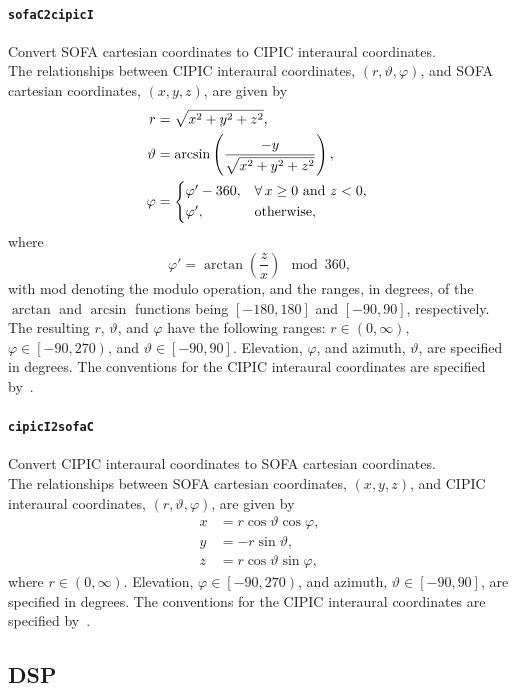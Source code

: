 \documentclass[11pt, oneside]{article}
\newcommand{\function}[1]{\paragraph*{\texttt{#1}}}
\begin{document}
\function{sofaC2cipicI} Convert SOFA cartesian coordinates to CIPIC interaural coordinates. \\
The relationships between CIPIC interaural coordinates, $\left(r,\vartheta,\varphi\right)$, and SOFA cartesian coordinates, $\left(x,y,z\right)$, are given by
\begin{align}
r &= \sqrt{x^2 + y^2 + z^2}, \\
\vartheta &= \arcsin \left(\frac{-y}{\sqrt{x^2 + y^2 + z^2}}\right), \\
\varphi &= 
\begin{cases*}
\varphi' - 360, & $\forall\,x \geq 0$ and $z < 0$, \\
\varphi', & otherwise,
\end{cases*}
\end{align}
where
\begin{equation}
\varphi' =  \arctan \left(\frac{z}{x}\right) \mod 360,
\end{equation}
with mod denoting the modulo operation, and the ranges, in degrees, of the $\arctan$ and $\arcsin$ functions being $\left[-180,180\right]$ and $\left[-90,90\right]$, respectively.
The resulting $r$, $\vartheta$, and $\varphi$ have the following ranges: $r \in (0,\infty)$, $\varphi \in \left[-90,270\right)$, and $\vartheta \in \left[-90,90\right]$.
Elevation, $\varphi$, and azimuth, $\vartheta$, are specified in degrees.
The conventions for the CIPIC interaural coordinates are specified by~\citet{Algazi2001}.

\function{cipicI2sofaC} Convert CIPIC interaural coordinates to SOFA cartesian coordinates. \\
The relationships between SOFA cartesian coordinates, $\left(x,y,z\right)$, and CIPIC interaural coordinates, $\left(r,\vartheta,\varphi\right)$, are given by
\begin{align}
x &= r \cos \vartheta \cos \varphi, \\
y &= -r \sin \vartheta, \\
z &= r \cos \vartheta \sin \varphi,
\end{align}
where $r \in (0,\infty)$.
Elevation, $\varphi \in \left[-90,270\right)$, and azimuth, $\vartheta \in \left[-90,90\right]$, are specified in degrees.
The conventions for the CIPIC interaural coordinates are specified by~\citet{Algazi2001}.

\subsection{DSP}
\end{document}
